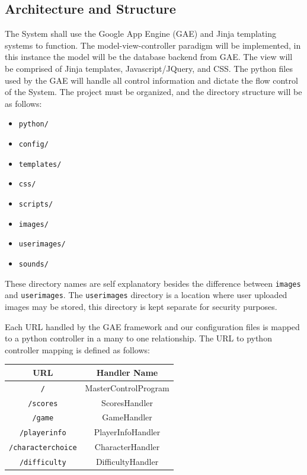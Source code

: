 \documentclass[12pt]{IEEEtran}
\begin{document}
\subsection{Architecture and Structure}
\label{subsec:arch}

	The System shall use the Google App Engine (GAE) and Jinja templating systems to function. The model-view-controller 			paradigm will be implemented, in this instance the model will be the database backend from GAE. The view will be 				comprised of Jinja templates, Javascript/JQuery, and CSS. The python files used by the GAE will handle all control 			information and dictate the flow control of the System. The project must be organized, and the directory structure will 			be as follows:

	\begin{itemize}
		\item \texttt{python/}
		\item \texttt{config/}
		\item \texttt{templates/}
		\item \texttt{css/}
		\item \texttt{scripts/}
		\item \texttt{images/}
		\item \texttt{userimages/}
		\item \texttt{sounds/}
	\end{itemize}

	These directory names are self explanatory besides the difference between \texttt{images} and \texttt{userimages}. 			The \texttt{userimages} directory is a location where user uploaded images may be stored, this directory is kept 				separate for security purposes. 

	Each URL handled by the GAE framework and our configuration files is mapped to a python controller in a many to one 			relationship. The URL to python controller mapping is defined as follows:
	
	\begin{center}
		\begin{tabular}{| c | c |}\hline
			\multicolumn{1}{|c}{URL} & \multicolumn{1}{c|}{ Handler Name }\\\hline
			 \texttt{/}			& MasterControlProgram\\\hline
			 \texttt{/scores} 		& ScoresHandler\\\hline
			 \texttt{/game} 		& GameHandler\\\hline
			 \texttt{/playerinfo}	& PlayerInfoHandler\\\hline
			 \texttt{/characterchoice} & CharacterHandler\\\hline
			 \texttt{/difficulty}		& DifficultyHandler\\\hline
		\end{tabular}
	\end{center}
\end{document}
